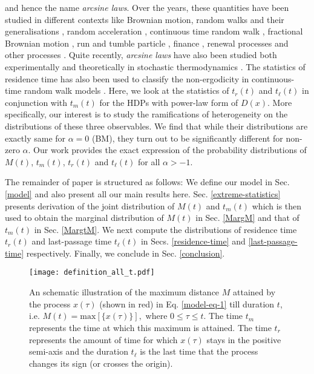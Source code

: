 \documentclass[showpacs,amsmath,amssymb,aps,pre,twocolumn,]{revtex4-1}
\def\bluew#1{{\color{black} #1}}
\begin{document}
and hence the name \textit{arcsine laws}. Over the years, these quantities have been studied in different contexts like Brownian motion, random walks and their generalisations \bluew{\cite{Comtetlast2020, Majumdar005, Dhar99,Majumdar02, SMajumdar02, Sabhapandit06, Hollander2019, Comtet2003}}, random acceleration \bluew{\cite{tmax-RAP, Boutcheng16}}, continuous time random walk \bluew{\cite{Carmi2010, tmax-CTRW}}, fractional Brownian motion \bluew{\cite{tmax-FBM-3}}, run and tumble particle \bluew{\cite{Bressloff2020, tmax-RTP-1}}, finance \bluew{\cite{Charles80, Shiryaev02, tmax-3}}, renewal processes and other processes \bluew{\cite{Baldassarri99, Godreche01,Burov11,Kasahara77, Lamperti58}}. Quite recently, \textit{arcsine laws} have also been studied both experimentally and theoretically in stochastic thermodynamics \bluew{\cite{Barato18,dey2021}}. The statistics of residence time has also been used to classify the non-ergodicity in continuous-time random walk models \bluew{\cite{Bel2005, Barkai2006}}. Here, we look at the statistics of $t_r(t)$ and $t_{\ell}(t)$ in conjunction with $t_m(t)$ for the HDPs with power-law form of $D(x)$. More specifically, our interest is to study the ramifications of heterogeneity on the distributions of these three observables. We find that while their distributions are exactly same for $\alpha =0$ (BM), they turn out to be significantly different for non-zero $\alpha$. Our work provides the exact expression of the probability distributions of $M(t)$, $t_m(t)$, $t_r(t)$ and $t_{\ell}(t)$ for all $\alpha >-1$.


The remainder of paper is structured as follows: We define our model in Sec. \ref{model} and also present all our main results here. Sec. \ref{extreme-statistics} presents derivation of the joint distribution of $M(t)$ and $t_m(t)$ which is then used to obtain the marginal distribution of $M(t)$ in Sec. \ref{MargM} and that of $t_m(t)$ in Sec. \ref{MargtM}. We next compute the distributions of residence time $t_r(t)$ and last-passage time $t_{\ell}(t)$ in Secs. \ref{residence-time} and \ref{last-passage-time} respectively. Finally, we conclude in Sec. \ref{conclusion}.

\begin{figure}[t]
\texttt{[image: definition\_all\_t.pdf]}
\centering
\caption{An schematic illustration of the maximum distance $M$ attained by the process $x(\tau)$ (shown in red) in Eq. \eqref{model-eq-1} till duration $t$, i.e. $M(t) = \text{max}[\{ x (\tau) \}],$ where $0 \leq  \tau \leq t$. The time $t_m$ represents the time at which this maximum is attained. The time $t_r$ represents the amount of time for which $x(\tau)$ stays in the positive semi-axis and the duration $t_{\ell}$ is the last time that the process changes its sign (or crosses the origin).}
\label{trajectory-pic-1}
\end{figure}
\end{document}
